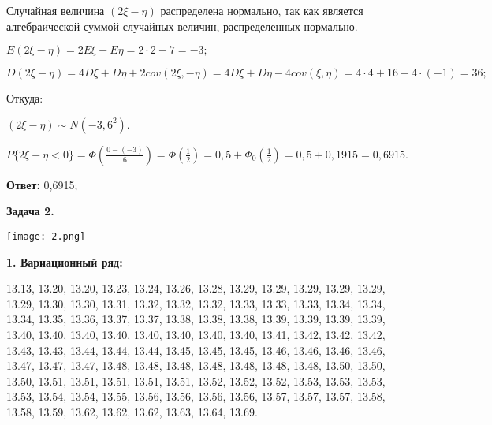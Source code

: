 \documentclass[]{article}
\begin{document}
\vspace{10pt}

Случайная величина  $(2 \xi - \eta)$ распределена нормально, так как является алгебраической суммой случайных величин, распределенных нормально.

\vspace{10pt}

$E(2\xi - \eta) = 2E\xi - E\eta = 2 \cdot 2 - 7 = -3;$

\vspace{10pt}

$D(2\xi - \eta) = 4D\xi + D\eta + 2cov(2\xi, -\eta) =  4D\xi + D\eta - 4cov(\xi, \eta) = 4 \cdot 4 + 16 - 4 \cdot (-1) = 36;$

\vspace{10pt}

Откуда:

\vspace{10pt}

$(2\xi - \eta) \sim N(-3, 6^2).$

\vspace{10pt}

$P\{2 \xi - \eta < 0\} = \Phi (\frac{0 - (-3)}{6}) = \Phi(\frac{1}{2}) = 0,5 + \Phi_0(\frac{1}{2}) = 0,5 + 0,1915 = 0,6915.$
 

	\vspace{20pt}
	
	\textbf{Ответ:} 0,6915;
	
	\newpage
	
	\centering
	\textbf{Задача 2.}
	
	\vspace{10pt}
	
	\raggedright
	\large
	
	\texttt{[image: 2.png]}
	
	\vspace{20pt}
	
	\textbf{1. Вариационный ряд:}\\
	
	\vspace{10pt}
	
	13.13, 13.20, 13.20, 13.23, 13.24, 13.26, 13.28, 13.29, 13.29, 13.29, 13.29, 13.29, 13.29, 13.30, 13.30, 13.31, 13.32, 13.32, 13.32, 13.33, 13.33, 13.33, 13.34, 13.34, 13.34, 13.35, 13.36, 13.37, 13.37, 13.38, 13.38, 13.38, 13.39, 13.39, 13.39, 13.39, 13.40, 13.40, 13.40, 13.40, 13.40, 13.40, 13.40, 13.40, 13.41, 13.42, 13.42, 13.42, 13.43, 13.43, 13.44, 13.44, 13.44, 13.45, 13.45, 13.45, 13.46, 13.46, 13.46, 13.46, 13.47, 13.47, 13.47, 13.48, 13.48, 13.48, 13.48, 13.48, 13.48, 13.48, 13.50, 13.50, 13.50, 13.51, 13.51, 13.51, 13.51, 13.51, 13.52, 13.52, 13.52, 13.53, 13.53, 13.53, 13.53, 13.54, 13.54, 13.55, 13.56, 13.56, 13.56, 13.56, 13.57, 13.57, 13.57, 13.58, 13.58, 13.59, 13.62, 13.62, 13.62, 13.63, 13.64, 13.69.\\
	
\end{document}
